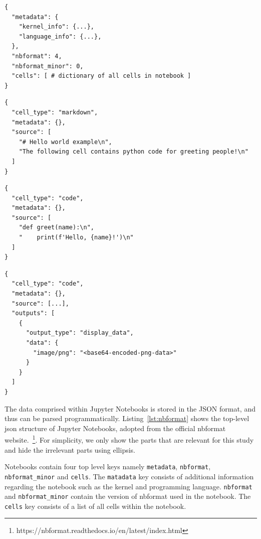 \documentclass[conference]{IEEEtran}
\begin{document}
\begin{lstlisting}[caption={Top-level JSON format of Jupyter notebooks. See Listing~\ref{lst:cell-md},~\ref{lst:cell-code} and~\ref{lst:cell-output} for internal structure of various cells.}, label={lst:nbformat}]
{
  "metadata": {
    "kernel_info": {...},
    "language_info": {...},
  },
  "nbformat": 4,
  "nbformat_minor": 0,
  "cells": [ # dictionary of all cells in notebook ]
}
\end{lstlisting}
\begin{lstlisting}[caption={JSON structure of markdown cells.}, label={lst:cell-md}]
{
  "cell_type": "markdown",
  "metadata": {},
  "source": [
    "# Hello world example\n",
    "The following cell contains python code for greeting people!\n"
  ]
}
\end{lstlisting}

\begin{lstlisting}[caption={JSON structure of code cells.}, label={lst:cell-code}]
{
  "cell_type": "code",
  "metadata": {},
  "source": [
    "def greet(name):\n",
    "    print(f'Hello, {name}!')\n"
  ]
}
\end{lstlisting}

\begin{lstlisting}[caption={JSON structure of code cells with an image output.}, label={lst:cell-output}]
{
  "cell_type": "code",
  "metadata": {},
  "source": [...],
  "outputs": [
    {
      "output_type": "display_data",
      "data": {
        "image/png": "<base64-encoded-png-data>"
      }
    }
  ]
}
\end{lstlisting}

The data comprised within Jupyter Notebooks is stored in the JSON format, and thus can be parsed programmatically. Listing~\ref{lst:nbformat} shows the top-level json structure of Jupyter Notebooks, adopted from the official nbformat website.~\footnote{https://nbformat.readthedocs.io/en/latest/index.html}. For simplicity, we only show the parts that are relevant for this study and hide the irrelevant parts using ellipsis.

Notebooks contain four top level keys namely \texttt{metadata}, \texttt{nbformat}, \texttt{nbformat\_minor} and \texttt{cells}. The \texttt{matadata} key consists of additional information regarding the notebook such as the kernel and programming language. \texttt{nbformat} and \texttt{nbformat\_minor} contain the version of nbformat used in the notebook. The \texttt{cells} key consists of a list of all cells within the notebook.
\end{document}
